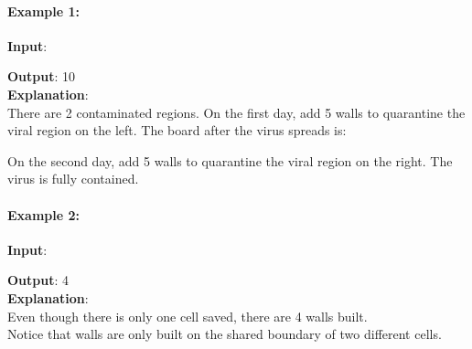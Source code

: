 \paragraph{Example 1:}
\begin{flushleft}
\textbf{Input}:
\begin{figure}[H]
\end{figure}
\textbf{Output}: 10
\\
\textbf{Explanation}:
\\
There are 2 contaminated regions. On the first day, add 5 walls to quarantine the viral region on the left. The board after the virus spreads is:
\begin{figure}[H]
\end{figure}
On the second day, add 5 walls to quarantine the viral region on the right. The virus is fully contained.
\end{flushleft}
\paragraph{Example 2:}
\begin{flushleft}
\textbf{Input}:
\begin{figure}[H]
\end{figure}
\textbf{Output}: 4
\\
\textbf{Explanation}: 
\\
Even though there is only one cell saved, there are 4 walls built.
\\
Notice that walls are only built on the shared boundary of two different cells.
\end{flushleft}

